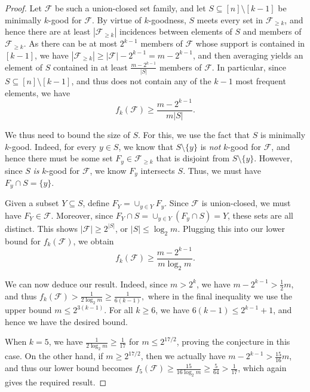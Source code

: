 \documentclass[a4paper,12pt]{article}
\theoremstyle{mystyle}	%
\theoremstyle{definition}
\newcommand{\6}{\partial}
\begin{document}
\begin{proof}
    Let $\mathcal{F}$ be such a union-closed set family, and let $S \subseteq [n] \setminus [k-1]$ be minimally $k$-good for $\mathcal{F}$. By virtue of $k$-goodness, $S$ meets every set in $\mathcal{F}_{\ge k}$, and hence there are at least $|\mathcal{F}_{\ge k}|$ incidences between elements of $S$ and members of $\mathcal{F}_{\ge k}$. As there can be at most $2^{k-1}$ members of $\mathcal{F}$ whose support is contained in $[k-1]$, we have $|\mathcal{F}_{\ge k}| \ge | \mathcal{F} | - 2^{k-1} = m - 2^{k-1}$, and then averaging yields an element of $S$ contained in at least $\frac{m-2^{k-1}}{|S|}$ members of $\mathcal{F}$. In particular, since $S \subseteq [n] \setminus [k-1]$, and thus does not contain any of the $k-1$ most frequent elements, we have
    \begin{equation*}
    f_k(\mathcal{F}) \ge \frac{m-2^{k-1}}{m|S|}.
    \end{equation*}

    We thus need to bound the size of $S$. For this, we use the fact that $S$ is minimally $k$-good. Indeed, for every $y \in S$, we know that $S \setminus \{y\}$ is \emph{not} $k$-good for $\mathcal{F}$, and hence there must be some set $F_y \in \mathcal{F}_{\ge k}$ that is disjoint from $S \setminus \{y\}$. However, since $S$ \emph{is} $k$-good for $\mathcal{F}$, we know $F_y$ intersects $S$. Thus, we must have $F_y \cap S = \{y\}$.

    Given a subset $Y \subseteq S$, define $F_Y = \cup_{y \in Y} F_y$. Since $\mathcal{F}$ is union-closed, we must have $F_Y \in \mathcal{F}$. Moreover, since $F_Y \cap S = \cup_{y \in Y} (F_y \cap S) = Y$, these sets are all distinct. This shows $|\mathcal{F}| \ge 2^{|S|}$, or $|S| \le \log_2 m$. Plugging this into our lower bound for $f_k(\mathcal{F})$, we obtain
    \begin{equation*}
        f_k(\mathcal{F}) \ge \frac{m-2^{k-1}}{m \log_2 m}.
    \end{equation*}

    We can now deduce our result. Indeed, since $m > 2^k$, we have $m - 2^{k-1} > \frac12 m$, and thus $f_k(\mathcal{F}) > \frac{1}{2 \log_2 m} \ge \frac{1}{6(k-1)},$ where in the final inequality we use the upper bound $m \le 2^{3(k-1)}$. For all $k \ge 6$, we have $6(k-1) \le 2^{k-1} + 1$, and hence we have the desired bound.

    When $k = 5$, we have $\frac{1}{2 \log_2 m} \ge \frac{1}{17}$ for $m \le 2^{17/2}$, proving the conjecture in this case. On the other hand, if $m \ge 2^{17/2}$, then we actually have $m - 2^{k-1} > \frac{15}{16} m$, and thus our lower bound becomes $f_5(\mathcal{F}) \ge \frac{15}{16 \log_2 m} \ge \frac{5}{64} > \frac{1}{17}$, which again gives the required result.
\end{proof}
    
\end{document}
